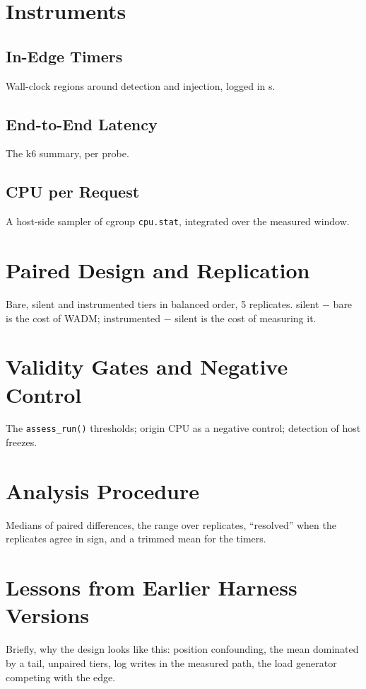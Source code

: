\documentclass{rptuma}
\begin{document}
\section{Instruments}
\subsection{In-Edge Timers}
Wall-clock regions around detection and injection, logged in \textmu s.
\subsection{End-to-End Latency}
The k6 summary, per probe.
\subsection{CPU per Request}
A host-side sampler of cgroup \texttt{cpu.stat}, integrated over the measured window.

\section{Paired Design and Replication}
Bare, silent and instrumented tiers in balanced order, 5 replicates. silent $-$ bare is the cost of
WADM; instrumented $-$ silent is the cost of measuring it.

\section{Validity Gates and Negative Control}
The \texttt{assess\_run()} thresholds; origin CPU as a negative control; detection of host freezes.

\section{Analysis Procedure}
Medians of paired differences, the range over replicates, ``resolved'' when the replicates agree
in sign, and a trimmed mean for the timers.

\section{Lessons from Earlier Harness Versions}
Briefly, why the design looks like this: position confounding, the mean dominated by a tail,
unpaired tiers, log writes in the measured path, the load generator competing with the edge.
\end{document}
